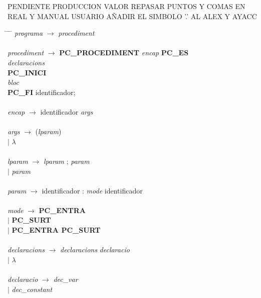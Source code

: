 \documentclass[10pt]{report}
\begin{document}
    PENDIENTE PRODUCCION VALOR
    REPASAR PUNTOS Y COMAS EN REAL Y MANUAL USUARIO
    AÑADIR EL SIMBOLO '.' AL ALEX Y AYACC
    \begin{tabbing}
    \hspace*{2.0cm} \= \hspace*{0.5cm} \= \hspace*{0.8cm} \= \kill
        \textit{programa} \> $\rightarrow $ \> \textit{procediment} \\
        \\
        \textit{procediment} \> $ \rightarrow $ \> \textbf{PC\_PROCEDIMENT} \textit{encap} \textbf{PC\_ES} \\
        \> \> \> \textit{declaracions} \\
        \> \> \textbf{PC\_INICI} \\
        \> \> \> \textit{bloc} \\
        \> \> \textbf{PC\_FI} identificador; \\
        \\
        \textit{encap} \> $ \rightarrow $ \> identificador \textit{args} \\
        \\
        \textit{args} \> $\rightarrow$ \> (\textit{lparam}) \\
        \> $ \mid $ \> $ \lambda $ \\
        \\
        \textit{lparam} \> $\rightarrow$ \> \textit{lparam} ; \textit{param} \\
        \> $\mid$ \> \textit{param} \\
        \\
        \textit{param} \> $\rightarrow$ \> identificador : \textit{mode} identificador \\
        \\
        \textit{mode} \> $\rightarrow$ \> \textbf{PC\_ENTRA} \\
        \> $\mid$ \> \textbf{PC\_SURT} \\
        \> $\mid$ \> \textbf{PC\_ENTRA PC\_SURT} \\
        \\
        \textit{declaracions} \> $\rightarrow$ \> \textit{declaracions} \textit{declaracio} \\
        \> $\mid$ \> $\lambda$ \\
        \\
        \textit{declaracio} \> $\rightarrow$ \> \textit{dec\_var} \\
        \> $\mid$ \> \textit{dec\_constant} \\

\end{tabbing}
\end{document}
